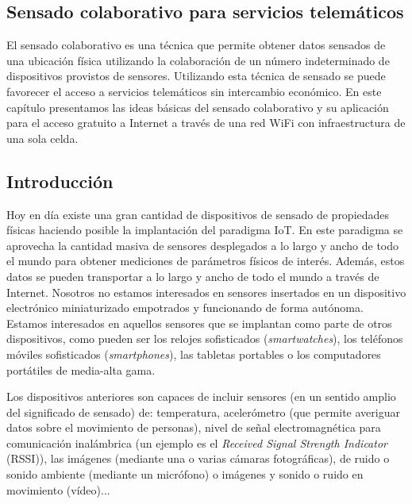 \clearpage
{}%
\begin{center}
\begin{minipage}{.75\textwidth}
\section{Sensado colaborativo para servicios telemáticos}

El sensado colaborativo es una técnica que permite obtener datos sensados de una ubicación física utilizando la colaboración de un número indeterminado de dispositivos provistos de sensores. Utilizando esta técnica de sensado se puede favorecer el acceso a servicios telemáticos sin intercambio económico. En este capítulo presentamos las ideas básicas del sensado colaborativo y su aplicación para el acceso gratuito a Internet a través de una red WiFi con infraestructura de una sola celda. %
\end{minipage}
\end{center}
\clearpage%
\subsection{Introducción}

Hoy en día existe una gran cantidad de dispositivos de sensado de propiedades físicas haciendo posible la implantación del paradigma IoT. En este paradigma se aprovecha la cantidad masiva de sensores desplegados a lo largo y ancho de todo el mundo para obtener mediciones de parámetros físicos de interés. Además, estos datos se pueden transportar a lo largo y ancho de todo el mundo a través de Internet. Nosotros no estamos interesados en sensores insertados en un dispositivo electrónico miniaturizado empotrados y funcionando de forma autónoma. Estamos interesados en aquellos sensores que se implantan como parte de otros dispositivos, como pueden ser los relojes sofisticados (\emph{smartwatches}), los teléfonos móviles sofisticados (\emph{smartphones}), las tabletas portables o los computadores portátiles de media-alta gama.

Los dispositivos anteriores son capaces de incluir sensores (en un sentido amplio del significado de sensado) de: temperatura, acelerómetro (que permite averiguar datos sobre el movimiento de personas), nivel de señal electromagnética para comunicación inalámbrica (un ejemplo es el \emph{Received Signal Strength Indicator} (\acrshort{RSSI})), las imágenes (mediante una o varias cámaras fotográficas), de ruido o sonido ambiente (mediante un micrófono) o imágenes y sonido o ruido en movimiento (vídeo)...

